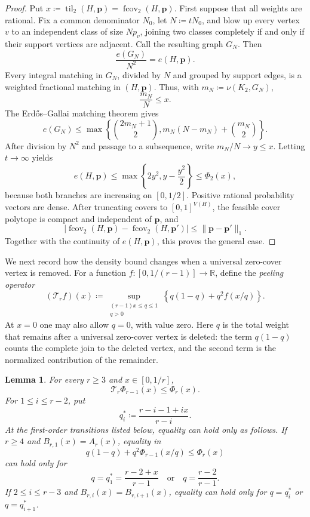 \documentclass[10pt]{article}
\numberwithin{equation}{section}
\newtheorem{lemma}[lemma]{Lemma}
\newcommand{\til}{\operatorname{til}}
\newcommand{\fcov}{\operatorname{fcov}}
\newcommand{\vct}[1]{\boldsymbol{#1}}
\newcommand{\R}{\mathbb R}
\begin{document}
\begin{proof}
Put $x\coloneqq\til_2(H,\vct p)=\fcov_2(H,\vct p)$.  First suppose that all weights are rational.  Fix a common denominator $N_0$, let $N\coloneqq tN_0$, and blow up every vertex $v$ to an independent class of size $Np_v$, joining two classes completely if and only if their support vertices are adjacent.  Call the resulting graph $G_N$.  Then
\[
 \frac{e(G_N)}{N^2}=e(H,\vct p).
\]
Every integral matching in $G_N$, divided by $N$ and grouped by support edges, is a weighted fractional matching in $(H,\vct p)$.  Thus, with $m_N\coloneqq\nu(K_2,G_N)$,
\[
 \frac{m_N}{N}\le x.
\]
The Erd\H{o}s--Gallai matching theorem \cite{EG59} gives
\[
 e(G_N)\le
 \max\left\{
   \binom{2m_N+1}{2},
   m_N(N-m_N)+\binom{m_N}{2}
 \right\}.
\]
After division by $N^2$ and passage to a subsequence, write $m_N/N\to y\le x$.  Letting $t\to\infty$ yields
\[
 e(H,\vct p)\le\max\left\{2y^2,y-\frac{y^2}{2}\right\}\le \Phi_2(x),
\]
because both branches are increasing on $[0,1/2]$.  Positive rational probability vectors are dense.  After truncating covers to $[0,1]^{V(H)}$, the feasible cover polytope is compact and independent of $\vct p$, and
\[
 |\fcov_2(H,\vct p)-\fcov_2(H,\vct p')|
 \le\|\vct p-\vct p'\|_1.
\]
Together with the continuity of $e(H,\vct p)$, this proves the general case.
\end{proof}

We next record how the density bound changes when a universal zero-cover vertex is removed.  For a function $f:[0,1/(r-1)]\to\R$, define the \emph{peeling operator}
\begin{equation}\label{eq:peeling-operator}
 (\mathcal T_rf)(x)
 \coloneqq\sup_{\substack{(r-1)x\le q\le1\\q>0}}
 \left\{q(1-q)+q^2f(x/q)\right\}.
\end{equation}
At $x=0$ one may also allow $q=0$, with value zero.  Here $q$ is the total weight that remains after a universal zero-cover vertex is deleted: the term $q(1-q)$ counts the complete join to the deleted vertex, and the second term is the normalized contribution of the remainder.

\begin{lemma}\label{lem:clique-recursion}
For every $r\ge3$ and $x\in[0,1/r]$,
\[
 \mathcal T_r\Phi_{r-1}(x)\le \Phi_r(x).
\]
For $1\le i\le r-2$, put
\[
 q_i^*\coloneqq\frac{r-i-1+ix}{r-i}.
\]
At the first-order transitions listed below, equality can hold only as follows.  If $r\ge4$ and $B_{r,1}(x)=A_r(x)$, equality in
\[
 q(1-q)+q^2\Phi_{r-1}(x/q)\le \Phi_r(x)
\]
can hold only for
\[
 q=q_1^*=\frac{r-2+x}{r-1}
 \quad\text{or}\quad
 q=\frac{r-2}{r-1}.
\]
If $2\le i\le r-3$ and $B_{r,i}(x)=B_{r,i+1}(x)$, equality can hold only for $q=q_i^*$ or $q=q_{i+1}^*$.
\end{lemma}
\end{document}
